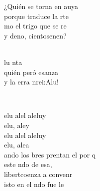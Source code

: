\documentclass[12pt]{article}
\begin{document}
\begin{multicols*}{2}
\begin{cancion}
	¿Quién se torna en auya\\
	porque traduce la rte\\
	mo el trigo que se re \\
	y deno, cientosenen?\\\jump\\
	\begin{chorus}%
	lu nta \\
	quién peró esanza\\
	y la erra nrei:Alu!\\
	\end{chorus}%
	\jump\\
\end{cancion}%

\begin{cancion}%
	elu  alel aleluy\\
	elu, aley\\
	elu  alel aleluy\\
	elu, alea\\
	ando los bres prentan el por q \\
	 este ndo de esa,\\
	 libertcoenza a convenr\\
	isto en el ndo fue le\\
\end{cancion}%


\end{multicols*}
\end{document}
